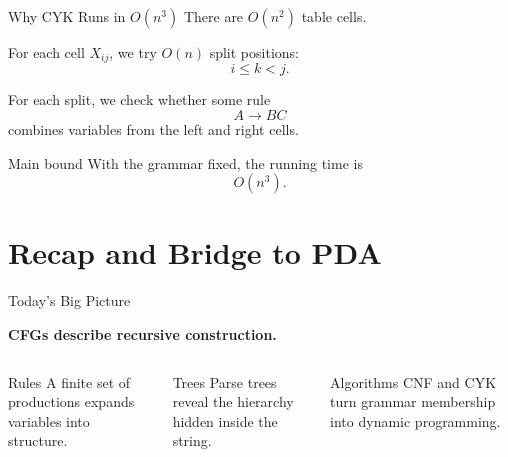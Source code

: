 \documentclass[aspectratio=169,10pt]{beamer}
\begin{document}
\begin{frame}{Why CYK Runs in \(O(n^3)\)}
\small
There are \(O(n^2)\) table cells.

For each cell \(X_{ij}\), we try \(O(n)\) split positions:
\[
i\le k<j.
\]

For each split, we check whether some rule
\[
A\to BC
\]
combines variables from the left and right cells.

\begin{exampleblock}{Main bound}
With the grammar fixed, the running time is
\[
O(n^3).
\]
\end{exampleblock}
\end{frame}

\section{Recap and Bridge to PDA}

\begin{frame}{Today's Big Picture}
\small
\begin{center}
\Large
\textbf{CFGs describe recursive construction.}
\end{center}

\vspace{0.8em}
\begin{columns}[T,onlytextwidth]
\begin{block}{Rules}
A finite set of productions expands variables into structure.
\end{block}

\begin{exampleblock}{Trees}
Parse trees reveal the hierarchy hidden inside the string.
\end{exampleblock}

\begin{alertblock}{Algorithms}
CNF and CYK turn grammar membership into dynamic programming.
\end{alertblock}
\end{columns}
\end{frame}
\end{document}
